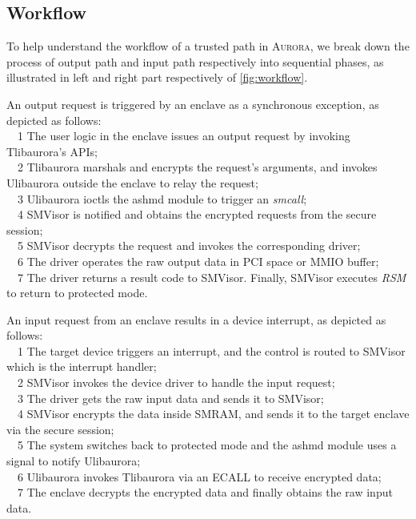 \subsection{Workflow}\label{workflow}
To help understand the workflow of a trusted path in \textsc{Aurora}, we break down the process of output path and input path respectively into sequential phases, as illustrated in left and right part respectively of \autoref{fig:workflow}.

An output request is triggered by an enclave as a synchronous exception, as depicted as follows:\\
~~\textcircled{\footnotesize{1}} The user logic in the enclave issues an output request by invoking  Tlibaurora's APIs;\\
~~\textcircled{\footnotesize{2}} Tlibaurora marshals and encrypts the request's arguments, and invokes Ulibaurora outside the enclave to relay the request;\\ %
~~\textcircled{\footnotesize{3}} Ulibaurora ioctls the ashmd module to trigger an \textit{smcall};\\
~~\textcircled{\footnotesize{4}} SMVisor is notified and obtains the encrypted requests from the secure session;\\
~~\textcircled{\footnotesize{5}} SMVisor decrypts the request and invokes the corresponding  driver;\\
~~\textcircled{\footnotesize{6}} The driver operates the raw output data in PCI space or MMIO buffer;\\
~~\textcircled{\footnotesize{7}} The driver returns a result code to SMVisor. Finally, SMVisor  executes \textit{RSM} to return to protected mode. \\

\par
An input request from an enclave results in a device interrupt, as depicted as follows:\\
~~\textcircled{\footnotesize{1}} The target device triggers an interrupt, and the control is routed to SMVisor which is the interrupt handler;\\
~~\textcircled{\footnotesize{2}} SMVisor invokes the device driver to handle the input request;\\
~~\textcircled{\footnotesize{3}} The driver gets the raw input data and sends it to SMVisor;\\
~~\textcircled{\footnotesize{4}} SMVisor encrypts the data inside SMRAM, and sends it to the target enclave via the secure session;\\
~~\textcircled{\footnotesize{5}} The system switches back to protected mode and the ashmd module uses a signal to notify Ulibaurora;\\
~~\textcircled{\footnotesize{6}} Ulibaurora invokes Tlibaurora via an ECALL to receive encrypted data;\\
~~\textcircled{\footnotesize{7}} The enclave decrypts the encrypted data and finally obtains the raw input data. %

